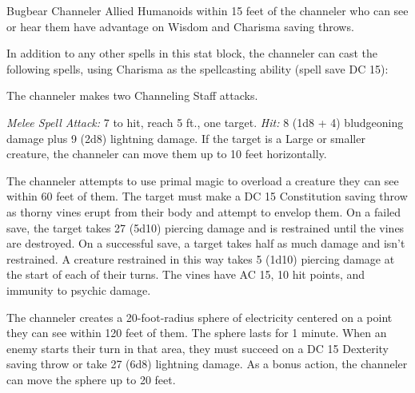 \documentclass[10pt,a4paper,twoside,bg=print,twocolumn,openany,nodeprecatedcode]{dndbook}
\begin{document}
\begin{DndMonster}[float=t]{Bugbear Channeler}
\DndMonsterBasics[
armor-class = {14 (studded leather armor)},
hit-points = {\DndDice{12d8 + 48}},
speed = {30 ft.}
]
\DndMonsterAbilityScores[
 str = 10,
 dex = 15,
 con = 18,
 int = 15,
 wis = 16,
 cha = 18
]
\DndMonsterDetails[
saving-throws = {Wis +6, Cha +7},
skills = {Arcana +5, Perception +6, Stealth +5, Survival +6},
senses = {darkvision 60 ft., passive perception 16},
languages = {Common, Goblin},
challenge = 7,
]
Allied Humanoids within 15 feet of the channeler who can see or hear them have advantage on Wisdom and Charisma saving throws.

In addition to any other spells in this stat block, the channeler can cast the following spells, using Charisma as the spellcasting ability (spell save DC 15):
\begin{DndMonsterSpells}
\end{DndMonsterSpells}
The channeler makes two Channeling Staff attacks.

\textsl{Melee Spell Attack:} 7 to hit, reach 5 ft., one target. \textsl{Hit:} 8 (1d8 + 4) bludgeoning damage plus 9 (2d8) lightning damage. If the target is a Large or smaller creature, the channeler can move them up to 10 feet horizontally.

The channeler attempts to use primal magic to overload a creature they can see within 60 feet of them. The target must make a DC 15 Constitution saving throw as thorny vines erupt from their body and attempt to envelop them. On a failed save, the target takes 27 (5d10) piercing damage and is restrained until the vines are destroyed. On a successful save, a target takes half as much damage and isn't restrained. A creature restrained in this way takes 5 (1d10) piercing damage at the start of each of their turns. The vines have AC 15, 10 hit points, and immunity to psychic damage.

The channeler creates a 20-foot-radius sphere of electricity centered on a point they can see within 120 feet of them. The sphere lasts for 1 minute. When an enemy starts their turn in that area, they must succeed on a DC 15 Dexterity saving throw or take 27 (6d8) lightning damage. As a bonus action, the channeler can move the sphere up to 20 feet.


\end{DndMonster}
\end{document}
